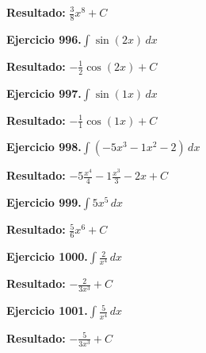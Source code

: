 \documentclass[10pt,a4paper]{article}
\begin{document}
\begin{solbox}
\textbf{Resultado:} \(\displaystyle \frac{3}{8}x^{8} + C\)
\end{solbox}

\begin{ejbox}
\textbf{Ejercicio 996.}\quad $\int \sin(2x)\,dx$
\end{ejbox}

\begin{solbox}
\textbf{Resultado:} \(\displaystyle -\frac{1}{2}\cos(2x) + C\)
\end{solbox}

\newpage
\begin{ejbox}
\textbf{Ejercicio 997.}\quad $\int \sin(1x)\,dx$
\end{ejbox}

\begin{solbox}
\textbf{Resultado:} \(\displaystyle -\frac{1}{1}\cos(1x) + C\)
\end{solbox}

\begin{ejbox}
\textbf{Ejercicio 998.}\quad $\int (-5x^3 -1x^2 -2)\,dx$
\end{ejbox}

\begin{solbox}
\textbf{Resultado:} \(\displaystyle -5\frac{x^4}{4} -1\frac{x^3}{3} -2x + C\)
\end{solbox}

\begin{ejbox}
\textbf{Ejercicio 999.}\quad $\int 5x^{5}\,dx$
\end{ejbox}

\begin{solbox}
\textbf{Resultado:} \(\displaystyle \frac{5}{6}x^{6} + C\)
\end{solbox}

\newpage
\begin{ejbox}
\textbf{Ejercicio 1000.}\quad $\int \frac{2}{x^{4}}\,dx$
\end{ejbox}

\begin{solbox}
\textbf{Resultado:} \(\displaystyle -\frac{2}{3x^{3}} + C\)
\end{solbox}

\begin{ejbox}
\textbf{Ejercicio 1001.}\quad $\int \frac{5}{x^{4}}\,dx$
\end{ejbox}

\begin{solbox}
\textbf{Resultado:} \(\displaystyle -\frac{5}{3x^{3}} + C\)
\end{solbox}
\end{document}
